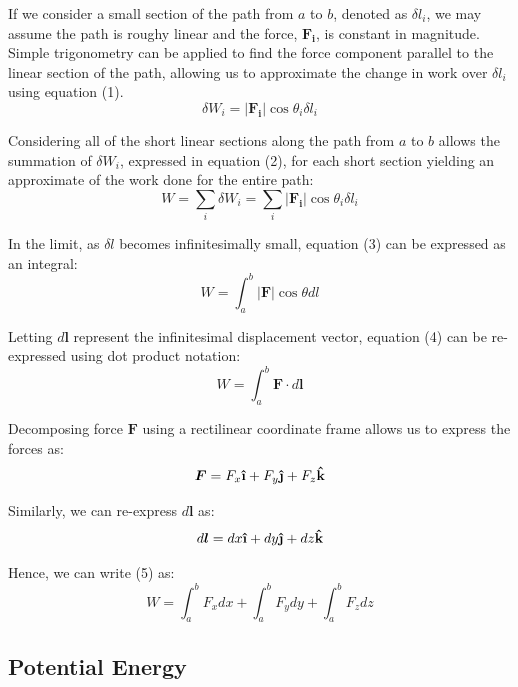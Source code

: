 \documentclass[a4paper]{article}
\newcommand{\uvec}[1]{\boldsymbol{\hat{\textbf{#1}}}}
\begin{document}
If we consider a small section of the path from $a$ to $b$, denoted as $\delta l_i$, we may assume the path is roughy linear and the force, $\boldsymbol{F_i}$, is constant in magnitude. Simple trigonometry can be applied to find the force component parallel to the linear section of the path, allowing us to approximate the change in work over $\delta l_i$ using equation (1).
\begin{equation}
\delta W_i = |\boldsymbol{F_i}| \cos\theta_i \delta l_i
\end{equation}

Considering all of the short linear sections along the path from $a$ to $b$ allows the summation of $\delta W_i$, expressed in equation (2), for each short section yielding an approximate of the work done for the entire path:
\begin{equation}
W = \sum_{i} \delta W_i = \sum_{i} |\boldsymbol{F_i}| \cos\theta_i \delta l_i
\end{equation}

In the limit, as $\delta l$ becomes infinitesimally small, equation (3) can be expressed as an integral:
\begin{equation}
W = \int_{a}^{b} |\boldsymbol{F}| \cos\theta dl
\end{equation}

Letting $d\boldsymbol{l}$ represent the infinitesimal displacement vector, equation (4) can be re-expressed using dot product notation:
\begin{equation}
W = \int_{a}^{b} \boldsymbol{F} \cdot d\boldsymbol{l}
\end{equation}

Decomposing force $\boldsymbol{F}$ using a rectilinear coordinate frame allows us to express the forces as:
\begin{equation}
\boldsymbol{F} = F_x \uvec{\i} + F_y \uvec{\j} + F_z \uvec{k}
\end{equation}

Similarly, we can re-express $d\boldsymbol{l}$ as:
\begin{equation}
d\boldsymbol{l} = dx \uvec{\i} + dy \uvec{\j} + dz \uvec{k}
\end{equation}

Hence, we can write (5) as:
\begin{equation}
W = \int_{a}^{b} F_x dx + \int_{a}^{b} F_y dy + \int_{a}^{b} F_z dz
\end{equation}

\subsection{Potential Energy}
\end{document}
